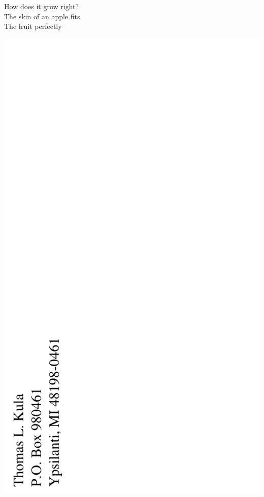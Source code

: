 \documentclass[12pt]{article}
\begin{document}
How does it grow right? \\
The skin of an apple fits \\
The fruit perfectly

\newpage

\includegraphics{backpage.png}
\end{document}
